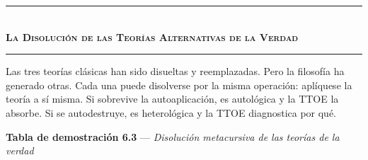 \documentclass[10pt, openany, oneside]{book}
\renewcommand{\normalsize}{\fontsize{10}{13}\selectfont}
\begin{document}
\vspace{1.5em}


\begin{center}
    \rule{0.3\textwidth}{0.4pt}\\[0.5em]
    {\normalsize\bfseries\scshape La Disolución de las Teorías Alternativas de la Verdad}\\[0.3em]
    \rule{0.3\textwidth}{0.4pt}
\end{center}

\vspace{1em}

\noindent Las tres teorías clásicas han sido disueltas y reemplazadas. Pero la filosofía ha generado otras. Cada una puede disolverse por la misma operación: aplíquese la teoría a sí misma. Si sobrevive la autoaplicación, es autológica y la TTOE la absorbe. Si se autodestruye, es heterológica y la TTOE diagnostica por qué.

\textbf{Tabla de demostración 6.3} --- \textit{Disolución metacursiva de las teorías de la verdad}

\vspace{0.5em}
\end{document}
